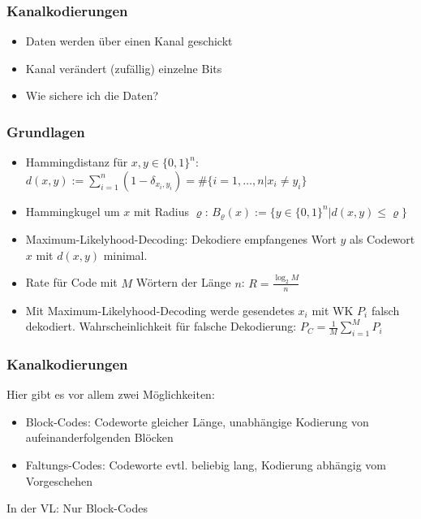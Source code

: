 \documentclass{beamer}
\begin{document}
\begin{frame}
\frametitle{Kanalkodierungen}
\begin{itemize}
\item Daten werden über einen Kanal geschickt\pause
\item Kanal verändert (zufällig) einzelne Bits\pause
\item Wie sichere ich die Daten?
\end{itemize}
\end{frame}

\begin{frame}
\frametitle{Grundlagen}
\begin{itemize}
\item Hammingdistanz für $x,y \in \{0,1\}^n$: $d(x,y):=\sum\limits_{i=1}^n  (1-\delta_{x_i,y_i})=\#\{i=1,\ldots,n|x_i\neq y_i\}$\pause
\item Hammingkugel um $x$ mit Radius $\varrho$: $B_\varrho(x):=\{y\in\{0,1\}^n|d(x,y)\leq \varrho\}$\pause
\item Maximum-Likelyhood-Decoding: Dekodiere empfangenes Wort $y$ als Codewort $x$ mit $d(x,y)$ minimal.\pause
\item Rate für Code mit $M$ Wörtern der Länge $n$: $R=\frac{\log_2 M}{n}$\pause
\item Mit Maximum-Likelyhood-Decoding werde gesendetes $x_i$ mit WK $P_i$ falsch dekodiert. Wahrscheinlichkeit für falsche Dekodierung: $P_C=\frac{1}{M}\sum\limits_{i=1}^M P_i$
\end{itemize}
\end{frame}

\begin{frame}
\frametitle{Kanalkodierungen}
Hier gibt es vor allem zwei Möglichkeiten:\pause
\begin{itemize}
\item Block-Codes: Codeworte gleicher Länge, unabhängige Kodierung von aufeinanderfolgenden Blöcken
\item Faltungs-Codes: Codeworte evtl. beliebig lang, Kodierung abhängig vom Vorgeschehen\pause
\end{itemize}
In der VL: Nur Block-Codes
\end{frame}
\end{document}
